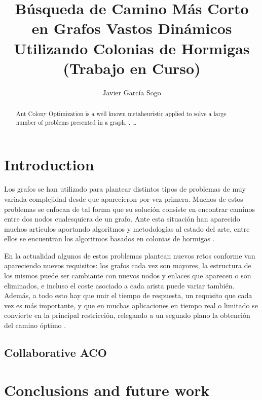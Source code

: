 \documentclass{llncs}
\begin{document}
%
\mainmatter              %
%
\title{Búsqueda de Camino Más Corto en Grafos Vastos Dinámicos Utilizando Colonias de Hormigas (Trabajo en Curso)}
%
%
\author{Javier Garc{\'i}a Sogo}
%
%
%

\maketitle              %

\begin{abstract}
Ant Colony Optimization is a well known metaheuristic applied to solve a large number of problems presented in a graph. 
. \dots
{}
\end{abstract}
%
\section{Introduction}
%
Los grafos se han utilizado para plantear distintos tipos de problemas de muy variada complejidad desde que aparecieron por vez primera.
Muchos de estos problemas se enfocan de tal forma que su solución consiste en encontrar caminos entre dos nodos cualesquiera de un grafo. 
Ante esta situación han aparecido muchos artículos aportando algoritmos y metodologías al estado del arte, entre ellos se encuentran los algoritmos basados en colonias de hormigas \cite{Dorigo1992}.

En la actualidad algunos de estos problemas plantean nuevos retos conforme van apareciendo nuevos requisitos: los grafos cada vez son mayores, la estructura de los mismos puede ser cambiante con nuevos nodos y enlaces que aparecen o son eliminados, e incluso el coste asociado a cada arista puede variar también.
Además, a todo esto hay que unir el tiempo de respuesta, un requisito que cada vez es más importante, y que en muchas aplicaciones en tiempo real o limitado se convierte en la principal restricción, relegando a un segundo plano la obtención del camino óptimo \cite{Rivero2011}.





%
\subsection{Collaborative ACO}
%

\section{Conclusions and future work}





%
%

\end{document}
